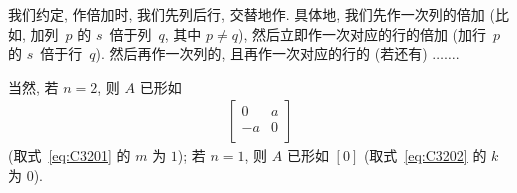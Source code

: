 \begin{theorem}
    我们约定, 作倍加时, 我们先列后行, 交替地作.
    具体地, 我们先作一次列的倍加
    (比如, 加列~\(p\) 的 \(s\)~倍于列~\(q\),
    其中 \(p \neq q\)),
    然后立即作一次对应的行的倍加
    (加行~\(p\) 的 \(s\)~倍于行~\(q\)).
    然后再作一次列的, 且再作一次对应的行的 (若还有)
    \(\dots \dots\).

    当然, 若 \(n = 2\), 则 \(A\) 已形如
    \begin{align*}
        \begin{bmatrix}
            0  & a \\
            -a & 0 \\
        \end{bmatrix}
    \end{align*}
    (取式~\eqref{eq:C3201} 的 \(m\) 为 \(1\));
    若 \(n = 1\), 则 \(A\) 已形如
    \([0]\)
    (取式~\eqref{eq:C3202} 的 \(k\) 为 \(0\)).
\end{theorem}

